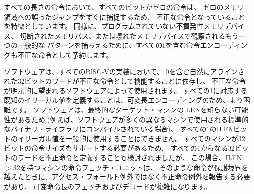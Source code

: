 \begin{comment}
\begin{commentary}
We consider it a feature that any length of instruction containing all
zero bits is not legal, as this quickly traps erroneous jumps into
zeroed memory regions. Similarly, we also reserve the instruction
encoding containing all ones to be an illegal instruction, to catch
the other common pattern observed with unprogrammed non-volatile
memory devices, disconnected memory buses, or broken memory devices.

Software can rely on a naturally aligned 32-bit word containing zero to
act as an illegal instruction on all RISC-V implementations, to be used
by software where an illegal instruction is explicitly desired.
Defining a corresponding known illegal value for all ones is more
difficult due to the variable-length encoding.  Software cannot
generally use the illegal value of ILEN bits of all 1s, as software
might not know ILEN for the eventual target machine (e.g., if software
is compiled into a standard binary library used by many different
machines).  Defining a 32-bit word of all ones as illegal was also
considered, as all machines must support a 32-bit instruction size, but
this requires the instruction-fetch unit on machines with ILEN$>$32
report an illegal instruction exception rather than an access-fault
exception when such an instruction borders a protection boundary,
complicating variable-instruction-length fetch and decode.
\end{commentary}
\end{comment}

\begin{commentary}
すべての長さの命令において、すべてのビットがゼロの命令は、
ゼロのメモリ領域への誤ったジャンプをすぐに捕捉するため、
不正な命令となっていることを特徴としています。
同様に、プログラムされていない不揮発性メモリデバイス、
切断されたメモリバス、または壊れたメモリデバイスで観察されるもう一つの一般的な
パターンを捕らえるために、すべての1を含む命令エンコーディングも不正な命令として予約します。

ソフトウェアは、すべてのRISC-Vの実装において、
0を含む自然にアラインされた32ビットのワードが不正な命令として機能することに依存し、
不正な命令が明示的に望まれるソフトウェアによって使用されます。
すべての1に対応する既知のイリーガル値を定義することは、可変長エンコーディングのため、より困難です。
ソフトウェアは、最終的なターゲット・マシンのILENを知らない可能性があるため
(例えば、ソフトウェアが多くの異なるマシンで使用される標準的なバイナリ・ライブラリにコンパイルされている場合)、
すべての1のILENビットのイリーガル値を一般的に使用することはできません。 
すべてのマシンが32ビットの命令サイズをサポートする必要があるため、
すべての1からなる32ビットのワードを不正命令と定義することも検討されましたが、
この場合、ILEN$>$32を持つマシンの命令フェッチ・ユニットは、
そのような命令が保護境界を越えたときに、アクセス・フォールト例外ではなく不正命令例外を報告する必要があり、
可変命令長のフェッチおよびデコードが複雑になります。
\end{commentary}

